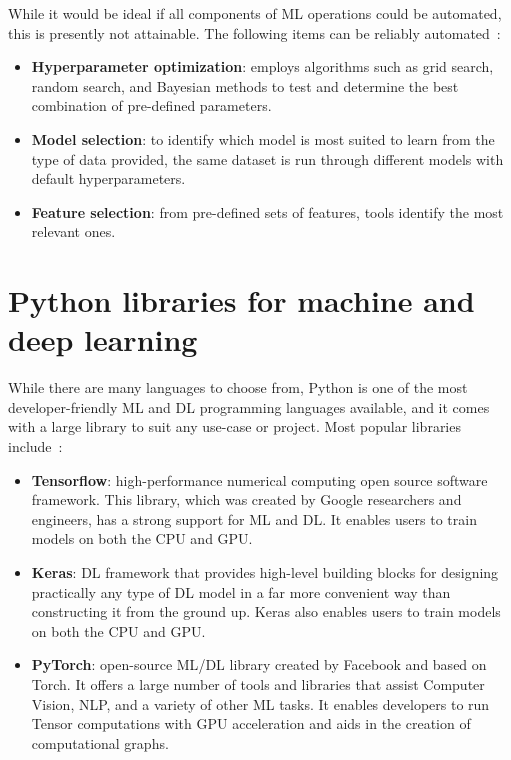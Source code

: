 While it would be ideal if all components of \gls{ML} operations could be automated, this is presently not attainable. The following items can be reliably automated~\cite{MachineRun:AI}:

\begin{itemize}
    \item \textbf{Hyperparameter optimization}: employs algorithms such as grid search, random search, and Bayesian methods to test and determine the best combination of pre-defined parameters.
    \item \textbf{Model selection}: to identify which model is most suited to learn from the type of data provided, the same dataset is run through different models with default hyperparameters.
    \item \textbf{Feature selection}: from pre-defined sets of features, tools identify the most relevant ones.
\end{itemize}

\section{Python libraries for machine and deep learning}

While there are many languages to choose from, Python is one of the most developer-friendly \gls{ML} and \gls{DL} programming languages available, and it comes with a large library to suit any use-case or project. Most popular libraries include~\cite{JonssonWaysDevelopment,BestGeeksforGeeks}:

\begin{itemize}
    \item \textbf{Tensorflow}: high-performance numerical computing open source software framework. This library, which was created by Google researchers and engineers, has a strong support for \gls{ML} and \gls{DL}.  It enables users to train models on both the CPU and GPU.
    \item \textbf{Keras}: \gls{DL} framework that provides high-level building blocks for designing practically any type of \gls{DL} model in a far more convenient way than constructing it from the ground up. Keras also enables users to train models on both the CPU and GPU.
    \item \textbf{PyTorch}: open-source \gls{ML}/\gls{DL} library created by Facebook and based on Torch. It offers a large number of tools and libraries that assist Computer Vision, \gls{NLP}, and a variety of other \gls{ML} tasks. It enables developers to run Tensor computations with GPU acceleration and aids in the creation of computational graphs.
\end{itemize}